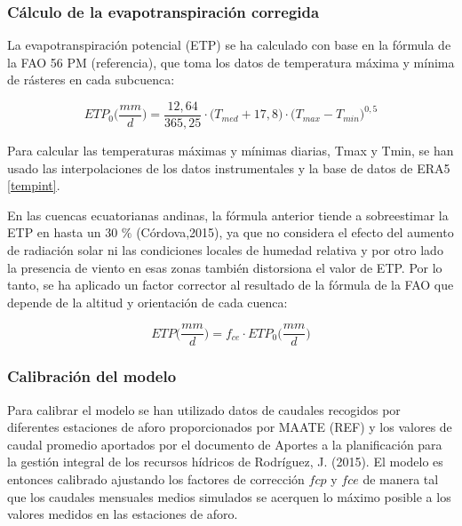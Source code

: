 \subsubsection{Cálculo de la evapotranspiración corregida}

La evapotranspiración potencial (ETP) se ha calculado con base en la fórmula de la FAO 56 PM (referencia), 
que toma los datos de temperatura máxima y mínima de rásteres en cada subcuenca:

\begin{equation}
    ETP_0\bigg(\frac{mm}{d}\bigg)=\frac{12,64}{365,25}\cdot \bigg(T_{med}+17,8\bigg)\cdot\bigg(T_{max}-T_{min}\bigg)^{0,5}
\end{equation}

Para calcular las temperaturas máximas y mínimas diarias, Tmax y Tmin, se han usado las interpolaciones de los datos 
instrumentales y la base de datos de ERA5 \ref{tempint}.


En las cuencas ecuatorianas andinas, la fórmula anterior tiende a sobreestimar la ETP en hasta un 30 $\%$ (Córdova,2015),
ya que no considera el efecto del aumento de radiación solar ni las condiciones locales de humedad relativa y por otro lado 
la presencia de viento en esas zonas también distorsiona el valor de ETP. Por lo tanto, se ha aplicado un factor corrector al 
resultado de la fórmula de la FAO que depende de la altitud y orientación de cada cuenca:

\begin{equation}
    ETP\bigg(\frac{mm}{d}\bigg)=f_{ce}\cdot ETP_0\bigg(\frac{mm}{d}\bigg)
\end{equation}

\subsubsection{Calibración del modelo}
Para calibrar el modelo se han utilizado datos de caudales recogidos por diferentes estaciones de aforo proporcionados por
MAATE (REF) y los valores de caudal promedio aportados por el documento de Aportes a la planificación para la gestión integral 
de los recursos hídricos de Rodríguez, J. (2015). 
El modelo es entonces calibrado ajustando los factores de corrección $fcp$ y $fce$ de manera tal que los caudales mensuales medios 
simulados se acerquen lo máximo posible a los valores medidos en las estaciones de aforo.



